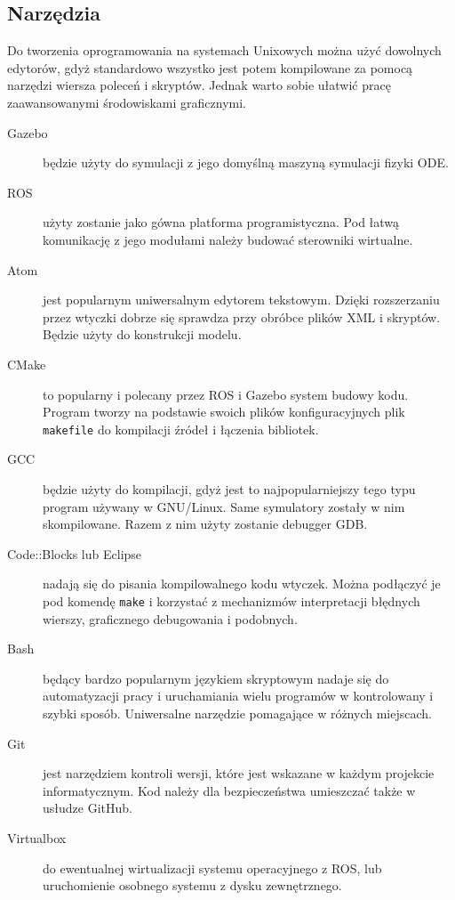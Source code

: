 \subsection{Narzędzia}
Do tworzenia oprogramowania na systemach Unixowych można użyć dowolnych edytorów, gdyż standardowo wszystko jest potem kompilowane za pomocą narzędzi wiersza poleceń i skryptów.
Jednak warto sobie ułatwić pracę zaawansowanymi środowiskami graficznymi.
\begin{description}
 \item[Gazebo] będzie użyty do symulacji z jego domyślną maszyną symulacji fizyki ODE.
 \item[ROS] użyty zostanie jako gówna platforma programistyczna. Pod łatwą komunikację z jego modułami należy budować sterowniki wirtualne.
 \item[Atom] jest popularnym uniwersalnym edytorem tekstowym. Dzięki rozszerzaniu przez wtyczki dobrze się sprawdza przy obróbce plików XML i skryptów.
 Będzie użyty do konstrukcji modelu.
 \item[CMake] to popularny i polecany przez ROS i Gazebo system budowy kodu. Program tworzy na podstawie swoich plików konfiguracyjnych plik \texttt{makefile} do kompilacji źródeł i łączenia bibliotek.
 \item[GCC] będzie użyty do kompilacji, gdyż jest to najpopularniejszy tego typu program używany w GNU/Linux. Same symulatory zostały w nim skompilowane.
 Razem z nim użyty zostanie debugger GDB. 
 \item[Code::Blocks lub Eclipse] nadają się do pisania kompilowalnego kodu wtyczek. Można podłączyć je pod komendę \texttt{make} i korzystać z mechanizmów interpretacji błędnych wierszy, graficznego debugowania i podobnych.
 \item[Bash] będący bardzo popularnym językiem skryptowym nadaje się do automatyzacji pracy i uruchamiania wielu programów w kontrolowany i szybki sposób.
 Uniwersalne narzędzie pomagające w różnych miejscach.
 \item[Git] jest narzędziem kontroli wersji, które jest wskazane w każdym projekcie informatycznym. Kod należy dla bezpieczeństwa umieszczać także w usłudze GitHub.
 \item[Virtualbox] do ewentualnej wirtualizacji systemu operacyjnego z ROS, lub uruchomienie osobnego systemu z dysku zewnętrznego.
\end{description}

